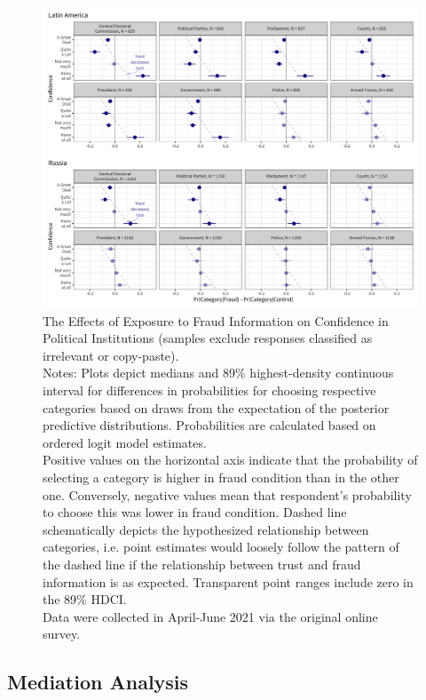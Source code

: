 \documentclass[11pt, ngerman,english,a4]{article}
\begin{document}
    \begin{figure}[H]
    \centering
    \includegraphics[width=\linewidth,trim=4 4 4 4,clip]{figs/main_hdi89_3.png}
    \caption{The Effects of Exposure to Fraud Information on Confidence in Political Institutions (samples exclude responses classified as irrelevant or copy-paste).  \\
     \footnotesize{Notes: Plots depict medians and 89\% highest-density continuous interval for differences in probabilities for choosing respective categories based on draws from the expectation of the posterior predictive distributions. Probabilities are calculated based on ordered logit model estimates.\\
     Positive values on the horizontal axis indicate that the probability of selecting a category is higher in fraud condition than in the other one. Conversely, negative values mean that respondent's probability to choose this was lower in fraud condition. Dashed line schematically depicts the hypothesized relationship between categories, i.e. point estimates would loosely follow the pattern of the dashed line if the relationship between trust and fraud information is as expected. Transparent point ranges include zero in the 89\% HDCI.\\
     Data were collected in April-June 2021 via the original online survey. } }
    \singlespacing
    \raggedright
    
    \label{fig:main-3}
    \end{figure}
\subsection*{Mediation Analysis}
\end{document}
